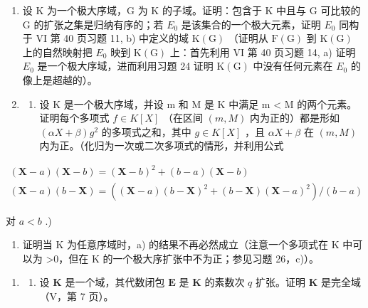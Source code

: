 \begin{enumerate}
\def\labelenumi{\arabic{enumi})}
\setcounter{enumi}{28}
\item
  设 K 为一个极大序域，G 为 K 的子域。证明：包含于 K 中且与 G 可比较的 G 的扩张之集是归纳有序的；若 \(E_{0}\) 是该集合的一个极大元素，证明 \(E_{0}\) 同构于 VI 第 40 页习题 11, b) 中定义的域 \(\mathrm{K}(\mathrm{G})\) （证明从 \(\mathrm{F}(\mathrm{G})\) 到 \(\mathrm{K}(\mathrm{G})\) 上的自然映射把 \(E_{0}\) 映到 \(\mathrm{K}(\mathrm{G})\) 上：首先利用 VI 第 40 页习题 14, a) 证明 \(E_{0}\) 是一个极大序域，进而利用习题 24 证明 \(\mathrm{K}(\mathrm{G})\) 中没有任何元素在 \(E_{0}\) 的像上是超越的）。
\item
  \begin{enumerate}
  \def\labelenumii{\alph{enumii})}
  \tightlist
  \item
    设 K 是一个极大序域，并设 m 和 M 是 K 中满足 m \textless{} M 的两个元素。证明每个多项式 \(f \in K[X]\) （在区间 \((m, M)\) 内为正的）都是形如 \((\alpha X + \beta) g^{2}\) 的多项式之和，其中 \(g \in K[X]\) ，且 \(\alpha X + \beta\) 在 \((m, M)\) 内为正。（化归为一次或二次多项式的情形，并利用公式
  \end{enumerate}
\end{enumerate}

\[
\begin{array}{l} (\mathbf {X} - a) (\mathbf {X} - b) = (\mathbf {X} - b) ^ {2} + (b - a) (\mathbf {X} - b) \\ (\mathbf {X} - a) (b - \mathbf {X}) = ((\mathbf {X} - a) (b - \mathbf {X}) ^ {2} + (b - \mathbf {X}) (\mathbf {X} - a) ^ {2}) / (b - a) \end{array}
\]

对 \(a < b\) .)

\begin{enumerate}
\def\labelenumi{\alph{enumi})}
\setcounter{enumi}{1}
\tightlist
\item
  证明当 K 为任意序域时，a) 的结果不再必然成立（注意一个多项式在 K 中可以为 \textgreater0，但在 K 的一个极大序扩张中不为正；参见习题 26，c)）。
\end{enumerate}

\begin{enumerate}
\def\labelenumi{\arabic{enumi})}
\setcounter{enumi}{30}
\tightlist
\item
  \begin{enumerate}
  \def\labelenumii{\alph{enumii})}
  \tightlist
  \item
    设 \(\mathbf{K}\) 是一个域，其代数闭包 \(\mathbf{E}\) 是 \(\mathbf{K}\) 的素数次 \(q\) 扩张。证明 \(\mathbf{K}\) 是完全域（V，第 7 页）。
  \end{enumerate}
\end{enumerate}

